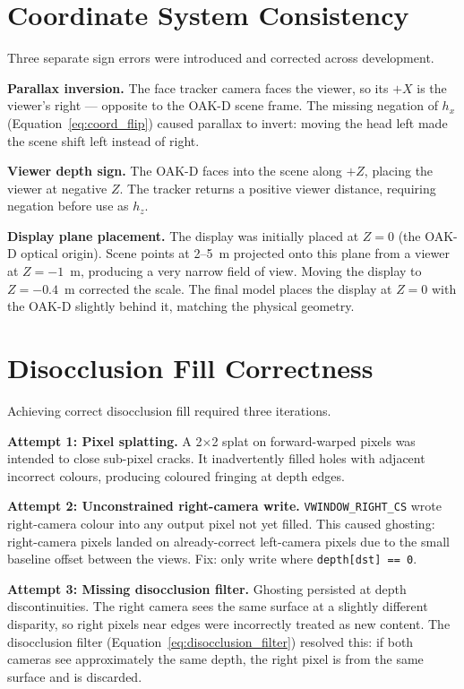 \documentclass[11pt, a4paper]{report}
\begin{document}
\section{Coordinate System Consistency}

Three separate sign errors were introduced and corrected across
development.

\textbf{Parallax inversion.}
The face tracker camera faces the viewer, so its $+X$ is the viewer's
right --- opposite to the OAK-D scene frame.
The missing negation of $h_x$ (Equation~\ref{eq:coord_flip}) caused
parallax to invert: moving the head left made the scene shift left
instead of right.

\textbf{Viewer depth sign.}
The OAK-D faces into the scene along $+Z$, placing the viewer at
negative $Z$.
The tracker returns a positive viewer distance, requiring negation
before use as $h_z$.

\textbf{Display plane placement.}
The display was initially placed at $Z = 0$ (the OAK-D optical origin).
Scene points at 2--5~m projected onto this plane from a viewer at
$Z = -1$~m, producing a very narrow field of view.
Moving the display to $Z = -0.4$~m corrected the scale.
The final model places the display at $Z = 0$ with the OAK-D slightly
behind it, matching the physical geometry.

\section{Disocclusion Fill Correctness}

Achieving correct disocclusion fill required three iterations.

\textbf{Attempt 1: Pixel splatting.}
A 2$\times$2 splat on forward-warped pixels was intended to close
sub-pixel cracks.
It inadvertently filled holes with adjacent incorrect colours, producing
coloured fringing at depth edges.

\textbf{Attempt 2: Unconstrained right-camera write.}
\texttt{VWINDOW\_RIGHT\_CS} wrote right-camera colour into any output
pixel not yet filled.
This caused ghosting: right-camera pixels landed on already-correct
left-camera pixels due to the small baseline offset between the views.
Fix: only write where \texttt{depth[dst] == 0}.

\textbf{Attempt 3: Missing disocclusion filter.}
Ghosting persisted at depth discontinuities.
The right camera sees the same surface at a slightly different disparity,
so right pixels near edges were incorrectly treated as new content.
The disocclusion filter (Equation~\ref{eq:disocclusion_filter}) resolved
this: if both cameras see approximately the same depth, the right pixel
is from the same surface and is discarded.
\end{document}
